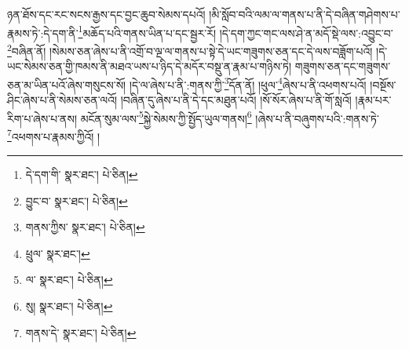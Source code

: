 ཉན་ཐོས་དང་རང་སངས་རྒྱས་དང་བྱང་ཆུབ་སེམས་དཔའོ། །མི་སློབ་བའི་ལམ་ལ་གནས་པ་ནི་དེ་བཞིན་གཤེགས་པ་རྣམས་ཏེ་:དེ་དག་ནི་\footnote{དེ་དག་གི་  སྣར་ཐང་།  པེ་ཅིན། }མཆོད་པའི་གནས་ཡིན་པ་དང་སྦྱར་རོ། །དེ་དག་ཀྱང་གང་ལས་ཤེ་ན་མདོ་སྡེ་ལས་:འབྱུང་བ་\footnote{བྱུང་བ་  སྣར་ཐང་།  པེ་ཅིན། }བཞིན་ནོ། །སེམས་ཅན་ཞེས་པ་ནི་འགྲོ་བ་ལྔ་ལ་གནས་པ་སྟེ་དེ་ཡང་གཟུགས་ཅན་དང་དེ་ལས་བཟློག་པའོ། །དེ་ཡང་སེམས་ཅན་གྱི་ཁམས་ནི་མཐའ་ཡས་པ་ཉིད་དེ་མདོར་བསྡུ་ན་རྣམ་པ་གཉིས་ཏེ། གཟུགས་ཅན་དང་གཟུགས་ཅན་མ་ཡིན་པའོ་ཞེས་གསུངས་སོ། །དེ་ལ་ཞེས་པ་ནི་:གནས་ཀྱི་\footnote{གནས་ཀྱིས་  སྣར་ཐང་།  པེ་ཅིན། }དོན་ནོ། །ཕུལ་\footnote{ཕྲུལ་  སྣར་ཐང་། }ཞེས་པ་ནི་འཕགས་པའོ། །བསྔོས་ཤིང་ཞེས་པ་ནི་སེམས་ཅན་ལའོ། །བཞིན་དུ་ཞེས་པ་ནི་དེ་དང་མཐུན་པའོ། །སོ་སོར་ཞེས་པ་ནི་གོ་སླའོ། །རྣམ་པར་རིག་པ་ཞེས་པ་ནས། མངོན་སུམ་ལས་\footnote{ལ་  སྣར་ཐང་།  པེ་ཅིན། }སྐྱེ་སེམས་ཀྱི་སྤྱོད་ཡུལ་གནས།\footnote{སུ།  སྣར་ཐང་།  པེ་ཅིན། } །ཞེས་པ་ནི་བཞུགས་པའི་:གནས་ཏེ་\footnote{གནས་དེ་  སྣར་ཐང་།  པེ་ཅིན། }འཕགས་པ་རྣམས་ཀྱིའོ། །
